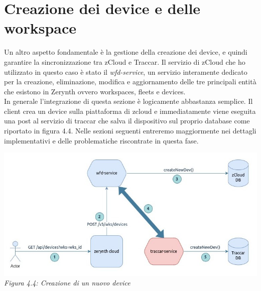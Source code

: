 \documentclass[a4paper,titlepage,12pt]{book}
\begin{document}
\section{\sffamily
Creazione dei device e delle workspace}
Un altro aspetto fondamentale è la gestione della creazione dei device, e quindi garantire la sincronizzazione tra zCloud e Traccar. Il servizio di zCloud che ho utilizzato in questo caso è stato il \textit{wfd-service}, un servizio interamente dedicato per la creazione, eliminazione, modifica e aggiornamento delle tre principali entità che esistono in Zerynth ovvero workspaces, fleets e devices. \\
In generale l'integrazione di questa sezione è logicamente abbastanza semplice. Il client crea un device sulla piattaforma di zcloud e immediatamente viene eseguita una post al servizio di traccar che salva il dispositivo sul proprio database come riportato in figura 4.4. Nelle sezioni seguenti entreremo maggiormente nei dettagli implementativi e delle problematiche riscontrate in questa fase.


\begin{center}
\includegraphics[scale=0.6]{images/dev_create.jpg}\\ 
\textit{Figura 4.4: Creazione di un nuovo device}
\end{center}
\end{document}
